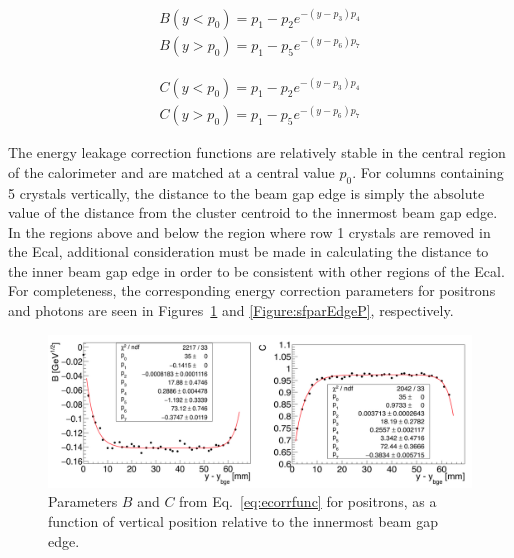 \begin{equation}
\begin{split}
\label{eq:p1parlt}
B(y<p_0) = p_1-p_2 e^{-(y-p_3)p_4}\\
B(y>p_0) = p_1-p_5 e^{-(y-p_6)p_7}
\end{split}
\end{equation}

\begin{equation}
\begin{split}
\label{eq:p2parlt}
C(y<p_0) = p_1-p_2 e^{-(y-p_3)p_4}\\
C(y>p_0) = p_1-p_5 e^{-(y-p_6)p_7}
\end{split}
\end{equation}

The energy leakage correction functions are relatively stable in the central region of the calorimeter and are matched at a central value $p_0$. For columns containing 5 crystals vertically, the distance to the beam gap edge is simply the absolute value of the distance from the cluster centroid to the innermost beam gap edge. In the regions above and below the region where row 1 crystals are removed in the Ecal, additional consideration must be made in calculating the distance to the inner beam gap edge in order to be consistent with other regions of the Ecal. For completeness, the corresponding energy correction parameters for positrons and photons are seen in Figures~\ref{Figure:sfparEdgeEP} and \ref{Figure:sfparEdgeP}, respectively. 


\begin{figure}[H]
  \centering
      \includegraphics[width=1.0\textwidth]{pics/performance/sfparEdge_ep.png}
  \caption[Ecal energy shower parameters for positrons relative to the inside beam gap edge]{Parameters $B$ and $C$ from Eq.~\ref{eq:ecorrfunc} for positrons, as a function of vertical position
relative to the innermost beam gap edge.}
  \label{Figure:sfparEdgeEP}
\end{figure}

